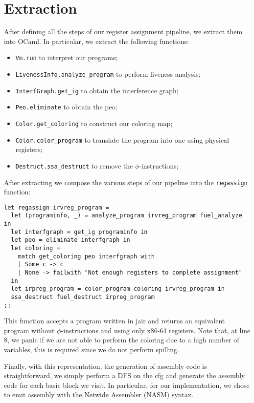
\chapter{Extraction}
\label{cha:extraction}

After defining all the steps of our register assignment pipeline, we extract them into OCaml.
In particular, we extract the following functions:
\begin{itemize}
  \item \texttt{Vm.run} to interpret our programs;
  \item \texttt{LivenessInfo.analyze\_program} to perform liveness analysis;
  \item \texttt{InterfGraph.get\_ig} to obtain the interference graph;
  \item \texttt{Peo.eliminate} to obtain the \gls{peo};
  \item \texttt{Color.get\_coloring} to construct our coloring map;
  \item \texttt{Color.color\_program} to translate the program into one using physical registers;
  \item \texttt{Destruct.ssa\_destruct} to remove the $\phi$-instructions;
\end{itemize}

After extracting we compose the various steps of our pipeline into the \texttt{regassign} function:

\begin{lstlisting}[style=OCaml]
let regassign irvreg_program =
  let (programinfo, _) = analyze_program irvreg_program fuel_analyze in
  let interfgraph = get_ig programinfo in
  let peo = eliminate interfgraph in
  let coloring =
    match get_coloring peo interfgraph with
    | Some c -> c
    | None -> failwith "Not enough registers to complete assignment"
  in
  let irpreg_program = color_program coloring irvreg_program in
  ssa_destruct fuel_destruct irpreg_program
;;
\end{lstlisting}

This function accepts a program written in \gls{jair} and returns an equivalent program without $\phi$-instructions and using only x86-64 registers.
Note that, at line 8, we panic if we are not able to perform the coloring due to a high number of variables, this is required since we do not perform spilling.

Finally, with this representation, the generation of assembly code is straightforward, we simply perform a DFS on the \gls{cfg} and generate the assembly code for each basic block we visit.
In particular, for our implementation, we chose to emit assembly with the Netwide Assembler (NASM) syntax.

